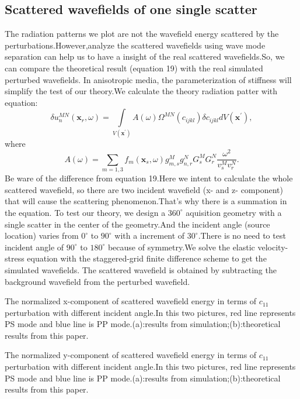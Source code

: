 \subsection{Scattered wavefields of one single scatter}
The radiation patterns we plot are not the wavefield energy scattered by
the perturbations.However,analyze the scattered wavefields using wave mode separation 
can help us to have a insight of the real scattered wavefields.So, we can compare the
theoretical result (equation 19) with the real simulated perturbed wavefields.
In anisotropic media, the parameterization of stiffness will simplify the test of our
theory.We calculate the theory radiation patter with equation:
\begin{equation}
	\delta
	u^{MN}_n(\mathbf{x}_r,\omega)=\int\limits_{V(\mathbf{x}^{'})}
	A(\omega)\Omega^{MN}(c_{ijkl})\delta c_{ijkl}dV(\mathbf{x}^{'}),
	\label{eq:Kernel}
\end{equation}
where
\begin{equation}
	A(\omega)=\sum_{m=1,3}f_m(\mathbf{x}_s,\omega)g^M_{m,s}g^N_{n,r}
	G^M_sG^N_r\frac{\omega^2}{v^M_sv^N_r}.
	\label{eq:A}
\end{equation}
Be ware of the difference from equation 19.Here we intent to calculate the whole
scattered wavefield, so there are two incident wavefield (x- and z- component) that
will cause the scattering phenomenon.That's why there is a summation in the equation.
To test our theory, we design a $360^\circ$
aquisition geometry with a single scatter in the center of the geometry.And the incident
angle (source location) varies from $0^\circ$ to $90^\circ$ with a increment of
$30^\circ$.There is no need to test incident angle of $90^\circ$ to $180^\circ$
because of symmetry.We solve the elastic velocity-stress equation with the
staggered-grid finite difference scheme to get the simulated wavefields.
The scattered wavefield is obtained by subtracting the background wavefield from the
perturbed wavefield.

{The normalized x-component of scattered wavefield energy in terms of $c_{11}$ perturbation with
different incident angle.In this two pictures, red line represents PS mode and blue line is PP
	mode.(a):results from simulation;(b):theoretical results from this paper.
	}

{The normalized y-component of scattered wavefield energy in terms of $c_{11}$ perturbation with
different incident angle.In this two pictures, red line represents PS mode and blue line is PP
	mode.(a):results from simulation;(b):theoretical results from this paper.
	}

